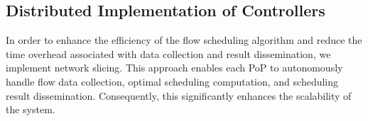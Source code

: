 \subsection{Distributed Implementation of Controllers}\label{sec:Network Slicing}
In order to enhance the efficiency of the flow scheduling algorithm and reduce the time overhead associated with data collection and result dissemination, we implement network slicing. This approach enables each PoP to autonomously handle flow data collection, optimal scheduling computation, and scheduling result dissemination. Consequently, this significantly enhances the scalability of the system.


